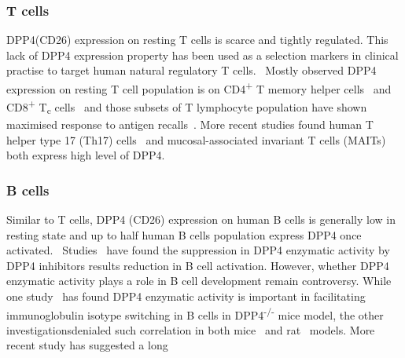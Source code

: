 \subsubsection{T cells}
DPP4(CD26) expression on resting T cells is scarce and tightly regulated. This lack of DPP4 expression property has been used as a selection markers in clinical practise to target human natural regulatory T cells.~\cite{Salgado2012,Garcia2014} Mostly observed DPP4 expression on resting T cell population is on CD4\textsuperscript{+} T memory helper cells~\cite{Gorrell1991, Morimoto1998} and CD8\textsuperscript{+} T\textsubscript{c} cells~\cite{Waumans2015,Hatano2013} and those subsets of T lymphocyte population have shown maximised response to antigen recalls~\cite{Waumans2015,Morimoto1998,Hatano2013}. More recent studies found human T helper type 17 (Th17) cells~\cite{Bengsch2012} and mucosal-associated invariant T cells (MAITs)~\cite{Sharma2015} both express high level of DPP4.

\subsubsection{B cells}
Similar to T cells, DPP4 (CD26) expression on human B cells is generally low in resting state and up to half human B cells population express DPP4 once activated.~\cite{B_hling_1995} Studies~\cite{B_hling_1995,Micouin1997} have found the suppression in DPP4 enzymatic activity by DPP4 inhibitors results reduction in B cell activation. However, whether DPP4 enzymatic activity plays a role in B cell development remain controversy. While one study~\cite{Yan2003} has found DPP4 enzymatic activity is important in facilitating immunoglobulin isotype switching in B cells in DPP4\textsuperscript{-/-} mice model, the other investigationsdenialed such correlation in both mice~\cite{Vora2009} and rat~\cite{Coburn1994} models. More recent study has suggested a long
